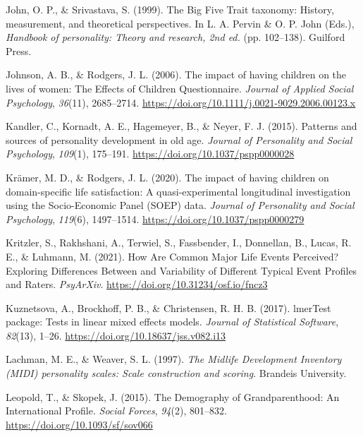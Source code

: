 \documentclass[
  english,
  man, noextraspace]{apa7}
\begin{document}
\leavevmode\hypertarget{ref-johnBigFiveTrait1999}{}%
John, O. P., \& Srivastava, S. (1999). The Big Five Trait taxonomy: History, measurement, and theoretical perspectives. In L. A. Pervin \& O. P. John (Eds.), \emph{Handbook of personality: Theory and research, 2nd ed.} (pp. 102--138). Guilford Press.

\leavevmode\hypertarget{ref-johnsonImpactHavingChildren2006}{}%
Johnson, A. B., \& Rodgers, J. L. (2006). The impact of having children on the lives of women: The Effects of Children Questionnaire. \emph{Journal of Applied Social Psychology}, \emph{36}(11), 2685--2714. \url{https://doi.org/10.1111/j.0021-9029.2006.00123.x}

\leavevmode\hypertarget{ref-kandlerPatternsSourcesPersonality2015a}{}%
Kandler, C., Kornadt, A. E., Hagemeyer, B., \& Neyer, F. J. (2015). Patterns and sources of personality development in old age. \emph{Journal of Personality and Social Psychology}, \emph{109}(1), 175--191. \url{https://doi.org/10.1037/pspp0000028}

\leavevmode\hypertarget{ref-kramerImpactHavingChildren2020}{}%
Krämer, M. D., \& Rodgers, J. L. (2020). The impact of having children on domain-specific life satisfaction: A quasi-experimental longitudinal investigation using the Socio-Economic Panel (SOEP) data. \emph{Journal of Personality and Social Psychology}, \emph{119}(6), 1497--1514. \url{https://doi.org/10.1037/pspp0000279}

\leavevmode\hypertarget{ref-kritzlerHowAreCommon2021}{}%
Kritzler, S., Rakhshani, A., Terwiel, S., Fassbender, I., Donnellan, B., Lucas, R. E., \& Luhmann, M. (2021). How Are Common Major Life Events Perceived? Exploring Differences Between and Variability of Different Typical Event Profiles and Raters. \emph{PsyArXiv}. \url{https://doi.org/10.31234/osf.io/fncz3}

\leavevmode\hypertarget{ref-R-lmerTest}{}%
Kuznetsova, A., Brockhoff, P. B., \& Christensen, R. H. B. (2017). lmerTest package: Tests in linear mixed effects models. \emph{Journal of Statistical Software}, \emph{82}(13), 1--26. \url{https://doi.org/10.18637/jss.v082.i13}

\leavevmode\hypertarget{ref-lachmanMidlifeDevelopmentInventory1997}{}%
Lachman, M. E., \& Weaver, S. L. (1997). \emph{The Midlife Development Inventory (MIDI) personality scales: Scale construction and scoring}. Brandeis University.

\leavevmode\hypertarget{ref-leopoldDemographyGrandparenthoodInternational2015}{}%
Leopold, T., \& Skopek, J. (2015). The Demography of Grandparenthood: An International Profile. \emph{Social Forces}, \emph{94}(2), 801--832. \url{https://doi.org/10.1093/sf/sov066}
\end{document}
